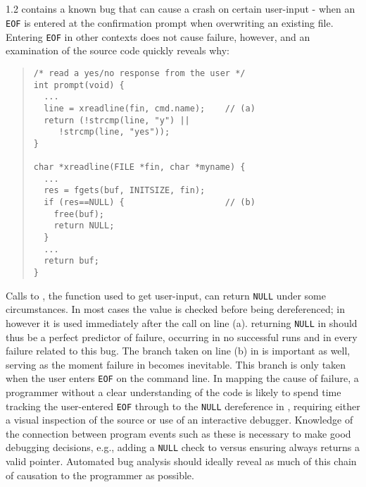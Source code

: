 
\subsection{\large\textbf{}}
\label{sec-ccrypt}
 1.2 contains a known bug that can cause a crash on certain user-input - when an \texttt{EOF} is entered at the confirmation prompt when overwriting an existing file.  Entering \texttt{EOF} in other contexts does not cause failure, however, and an examination of the source code quickly reveals why:
\begin{quote}
\small
\begin{verbatim}
/* read a yes/no response from the user */
int prompt(void) {
  ...
  line = xreadline(fin, cmd.name);    // (a)
  return (!strcmp(line, "y") ||
     !strcmp(line, "yes"));
}

char *xreadline(FILE *fin, char *myname) {
  ...
  res = fgets(buf, INITSIZE, fin);
  if (res==NULL) {                    // (b)
    free(buf);
    return NULL;
  }
  ...
  return buf;
}
\end{verbatim}
\end{quote}

Calls to , the function used to get user-input, can return \texttt{NULL} under some circumstances.  In most cases the value is checked before being dereferenced; in  however it is used immediately after the call on line (a).   returning \texttt{NULL} in  should thus be a perfect predictor of failure, occurring in no successful runs and in every failure related to this bug.  The branch taken on line (b) in  is important as well, serving as the moment failure in  becomes inevitable.  This branch is only taken when the user enters \texttt{EOF} on the command line.  In mapping the cause of failure, a programmer without a clear understanding of the code is likely to spend time tracking the user-entered \texttt{EOF} through  to the \texttt{NULL} dereference in , requiring either a visual inspection of the source or use of an interactive debugger.  Knowledge of the connection between program events such as these is necessary to make good debugging decisions, e.g., adding a \texttt{NULL} check to  versus ensuring  always returns a valid pointer.  Automated bug analysis should ideally reveal as much of this chain of causation to the programmer as possible.

